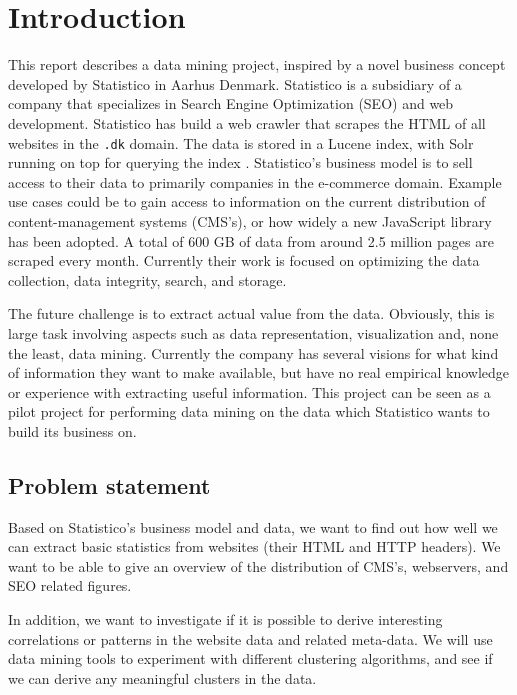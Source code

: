 \section{Introduction}
\label{sec:introduction}

This report describes a data mining project, inspired by a novel business concept developed by Statistico in Aarhus Denmark. Statistico is a subsidiary of a company that specializes in Search Engine Optimization (SEO) and web development. Statistico has build a web crawler that scrapes the HTML of all websites in the \texttt{.dk} domain. The data is stored in a Lucene index, with Solr running on top for querying the index \cite{lucene, solr}. Statistico's business model is to sell access to their data to primarily companies in the e-commerce domain. Example use cases could be to gain access to information on the current distribution of content-management systems (CMS's), or how widely a new JavaScript library has been adopted. A total of 600 GB of data from around 2.5 million pages are scraped every month. Currently their work is focused on optimizing the data collection, data integrity, search, and storage.

The future challenge is to extract actual value from the data. Obviously, this is large task involving aspects such as data representation, visualization and, none the least, data mining. Currently the company has several visions for what kind of information they want to make available, but have no real empirical knowledge or experience with extracting useful information. This project can be seen as a pilot project for performing data mining on the data which Statistico wants to build its business on.


\subsection{Problem statement}
\label{subsec:problem_statement}

Based on Statistico's business model and data, we want to find out how well we can extract basic statistics from websites (their HTML and HTTP headers). We want to be able to give an overview of the distribution of CMS's, webservers, and SEO related figures.

In addition, we want to investigate if it is possible to derive interesting correlations or patterns in the website data and related meta-data. We will use data mining tools to experiment with different clustering algorithms, and see if we can derive any meaningful clusters in the data.


